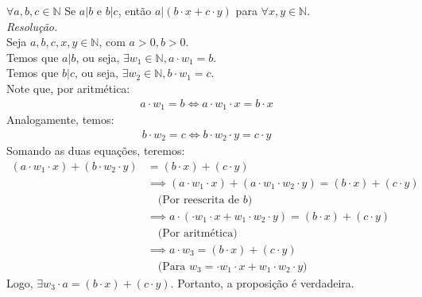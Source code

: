 $\forall a, b, c \in \mathbb{N}$ Se $a | b$ e $b | c$, então $a | (b \cdot x + c \cdot y)$ para $\forall x, y \in \mathbb{N}$. \\
\emph{Resolução.} \\
Seja $a, b, c, x, y \in \mathbb{N}$, com $a > 0, b > 0$. \\
Temos que $a | b$, ou seja, $\exists w_1 \in \mathbb{N}, a \cdot w_1 = b$. \\
Temos que $b | c$, ou seja, $\exists w_2 \in \mathbb{N}, b \cdot w_1 = c$. \\
Note que, por aritmética:
\begin{align*}
    a \cdot w_1 = b \iff a \cdot w_1 \cdot x = b \cdot x 
\end{align*}
Analogamente, temos:
\begin{align*}
    b \cdot w_2 = c \iff b \cdot w_2 \cdot y = c \cdot y 
\end{align*}
Somando as duas equações, teremos:
\begin{align*}
    (a \cdot w_1 \cdot x) + (b \cdot w_2 \cdot y) &= (b \cdot x) + (c \cdot y) \\ &\implies
    (a \cdot w_1 \cdot x) + (a \cdot w_1 \cdot w_2 \cdot y) = (b \cdot x) + (c \cdot y) \\ &\quad \text{(Por reescrita de $b$)}\\ &\implies
    a \cdot (\cdot w_1 \cdot x + w_1 \cdot w_2 \cdot y) = (b \cdot x) + (c \cdot y) \\ &\quad \text{(Por aritmética)} \\ &\implies
    a \cdot w_3 = (b \cdot x) + (c \cdot y) \\ &\quad \text{(Para $w_3 = \cdot w_1 \cdot x + w_1 \cdot w_2 \cdot y$)}
\end{align*}
Logo, $\exists w_3 \cdot a = (b \cdot x) + (c \cdot y)$. 
Portanto, a proposição é verdadeira.